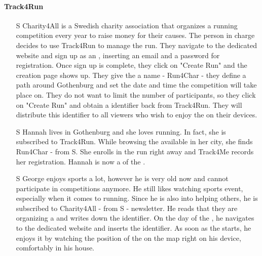 \documentclass[../../rasd.tex]{subfiles}
\begin{document}
                \paragraph{Track4Run}
                \begin{itemize}
                    \item[S\subs{8}] Charity4All is a Swedish charity association that organizes a running competition every year to raise money for their causes. The person in charge decides to use Track4Run to manage the run. They navigate to the  dedicated website and sign up as an , inserting an email and a password for registration. Once sign up is complete, they click on "Create Run" and the  creation page shows up. They give the  a name - Run4Char - they define a path around Gothenburg and set the date and time the competition will take place on. They do not want to limit the number of participants, so they click on "Create Run" and obtain a  identifier back from Track4Run. They will distribute this identifier to all viewers who wish to enjoy the  on their devices.

                    \item[S\subs{9}] Hannah lives in Gothenburg and she loves running. In fact, she is subscribed to Track4Run. While browsing the available  in her city, she finds Run4Char - from S. She enrolls in the run right away and Track4Me records her registration. Hannah is now a  of the .  

                    \item[S\subs{10}] George enjoys sports a lot, however he is very old now and cannot participate in competitions anymore. He still likes watching sports event, especially when it comes to running. Since he is also into helping others, he is subscribed to Charity4All - from S - newsletter. He reads that they are organizing a  and writes down the  identifier. On the day of the , he navigates to the  dedicated website and inserts the  identifier. As soon as the  starts, he enjoys it by watching the position of the  on the map right on his device, comfortably in his house.
                \end{itemize}
\end{document}
